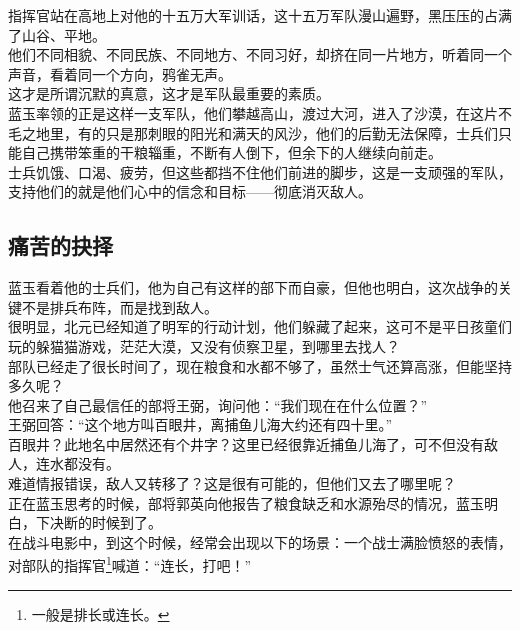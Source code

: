 \begin{multicols}{\theparacolNo}
指挥官站在高地上对他的十五万大军训话，这十五万军队漫山遍野，黑压压的占满了山谷、平地。\\

他们不同相貌、不同民族、不同地方、不同习好，却挤在同一片地方，听着同一个声音，看着同一个方向，鸦雀无声。\\

这才是所谓沉默的真意，这才是军队最重要的素质。\\

蓝玉率领的正是这样一支军队，他们攀越高山，渡过大河，进入了沙漠，在这片不毛之地里，有的只是那刺眼的阳光和满天的风沙，他们的后勤无法保障，士兵们只能自己携带笨重的干粮辎重，不断有人倒下，但余下的人继续向前走。\\

士兵饥饿、口渴、疲劳，但这些都挡不住他们前进的脚步，这是一支顽强的军队，支持他们的就是他们心中的信念和目标——彻底消灭敌人。\\

\subsection{痛苦的抉择}
蓝玉看着他的士兵们，他为自己有这样的部下而自豪，但他也明白，这次战争的关键不是排兵布阵，而是找到敌人。\\

很明显，北元已经知道了明军的行动计划，他们躲藏了起来，这可不是平日孩童们玩的躲猫猫游戏，茫茫大漠，又没有侦察卫星，到哪里去找人？\\

部队已经走了很长时间了，现在粮食和水都不够了，虽然士气还算高涨，但能坚持多久呢？\\

他召来了自己最信任的部将王弼，询问他：“我们现在在什么位置？”\\

王弼回答：“这个地方叫百眼井，离捕鱼儿海大约还有四十里。”\\

百眼井？此地名中居然还有个井字？这里已经很靠近捕鱼儿海了，可不但没有敌人，连水都没有。\\

难道情报错误，敌人又转移了？这是很有可能的，但他们又去了哪里呢？\\

正在蓝玉思考的时候，部将郭英向他报告了粮食缺乏和水源殆尽的情况，蓝玉明白，下决断的时候到了。\\

在战斗电影中，到这个时候，经常会出现以下的场景：一个战士满脸愤怒的表情，对部队的指挥官\footnote{一般是排长或连长。}喊道：“连长，打吧！”\\


\end{multicols}
